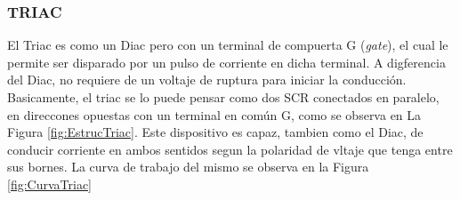     \subsubsection{TRIAC}
        
        El Triac es como un Diac pero con un terminal de compuerta G (\textit{gate}), 
        el cual le permite ser disparado por un pulso de corriente en dicha terminal.
        A digferencia del Diac, no requiere de un voltaje de ruptura para iniciar 
        la conducción. Basicamente, el triac se lo puede pensar como dos SCR conectados en 
        paralelo, en direccones opuestas con un terminal en común G, como se observa en La
        Figura \ref{fig:EstrucTriac}.
        Este dispositivo es capaz, tambien como el Diac, de conducir corriente en ambos
        sentidos segun la polaridad de vltaje que tenga entre sus bornes. La curva de trabajo
        del mismo se observa en la Figura \ref{fig:CurvaTriac}   
    
